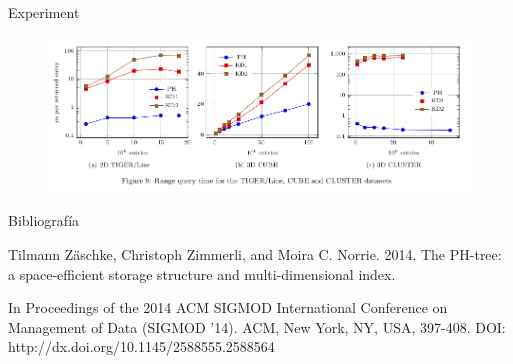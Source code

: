 \documentclass{beamer}
\begin{document}
\begin{frame}{Experiment}
 \begin{figure}
  \centering
  \includegraphics[scale = 0.35]{13.png}
 \end{figure}
\end{frame}

\begin{frame}{Bibliografía}
  \begin{thebibliography}{10}
  \beamertemplatebookbibitems
    Tilmann Zäschke, Christoph Zimmerli, and Moira C. Norrie. 2014.
    \newblock The PH-tree: a space-efficient storage structure and multi-dimensional index.\par
    In Proceedings of the 2014 ACM SIGMOD International Conference on Management of Data (SIGMOD '14).
    \newblock ACM, New York, NY, USA, 397-408.
    \newblock DOI: http://dx.doi.org/10.1145/2588555.2588564 
   \end{thebibliography}
\end{frame}
 
\end{document}
